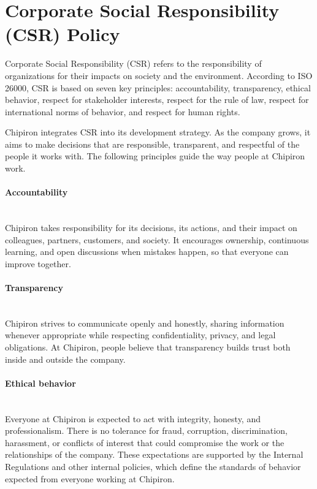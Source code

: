 \documentclass[12pt]{article}
\begin{document}
\section{Corporate Social Responsibility (CSR) Policy}
Corporate Social Responsibility (CSR) refers to the responsibility of organizations for their impacts on society and the environment. 
According to ISO 26000, CSR is based on seven key principles:
accountability, transparency, ethical behavior, respect for stakeholder interests, respect for the rule of law, respect for international norms of behavior, and respect for human rights.
\vspace{0.5cm}

Chipiron integrates CSR into its development strategy.
As the company grows, it aims to make decisions that are responsible, transparent, and respectful of the people it works with.
The following principles guide the way people at Chipiron work.

\paragraph{Accountability}
\mbox{}\\
Chipiron takes responsibility for its decisions, its actions, and their impact on colleagues, partners, customers, and society.
It encourages ownership, continuous learning, and open discussions when mistakes happen, so that everyone can improve together.

\paragraph{Transparency}
\mbox{}\\
Chipiron strives to communicate openly and honestly, sharing information whenever appropriate while respecting confidentiality, privacy, and legal obligations.
At Chipiron, people believe that transparency builds trust both inside and outside the company.

\paragraph{Ethical behavior}
\mbox{}\\
Everyone at Chipiron is expected to act with integrity, honesty, and professionalism.
There is no tolerance for fraud, corruption, discrimination, harassment, or conflicts of interest that could compromise the work or the relationships of the company.
These expectations are supported by the Internal Regulations and other internal policies, which define the standards of behavior expected from everyone working at Chipiron.
\end{document}
